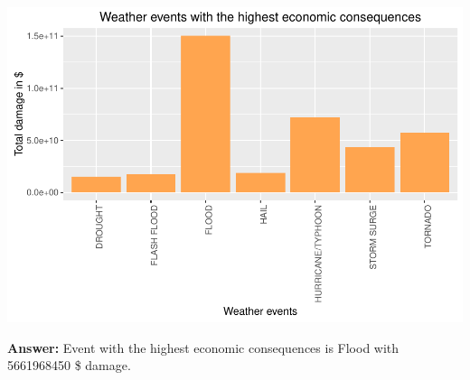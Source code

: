 \documentclass[]{article}
\begin{document}
\includegraphics{HarmfulEvents_files/figure-latex/unnamed-chunk-9-1.pdf}

\textbf{Answer:} Event with the highest economic consequences is Flood
with 5661968450 \$ damage.
\end{document}
